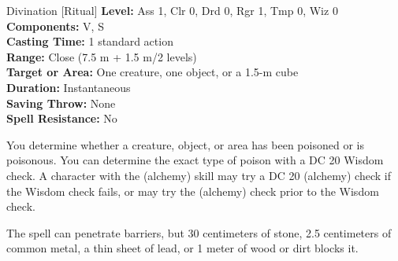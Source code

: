 {Divination [Ritual]}
{
	\textbf{Level:}
	Ass 1, Clr 0, Drd 0, Rgr 1, Tmp 0, Wiz 0\\
	\textbf{Components:}
	V, S\\
	\textbf{Casting Time:}
	1 standard action\\
	\textbf{Range:}
	Close (7.5 m + 1.5 m/2 levels)\\
	\textbf{Target or Area:}
	One creature, one object, or a 1.5-m cube\\
	\textbf{Duration:}
	Instantaneous\\
	\textbf{Saving Throw:}
	None\\
	\textbf{Spell Resistance:}
	No\\
}
{
	You determine whether a creature, object, or area has been poisoned or is poisonous. You can determine the exact type of poison with a DC 20 Wisdom check. A character with the  (alchemy) skill may try a DC 20  (alchemy) check if the Wisdom check fails, or may try the  (alchemy) check prior to the Wisdom check.

	The spell can penetrate barriers, but 30 centimeters of stone, 2.5 centimeters of common metal, a thin sheet of lead, or 1 meter of wood or dirt blocks it.

}
